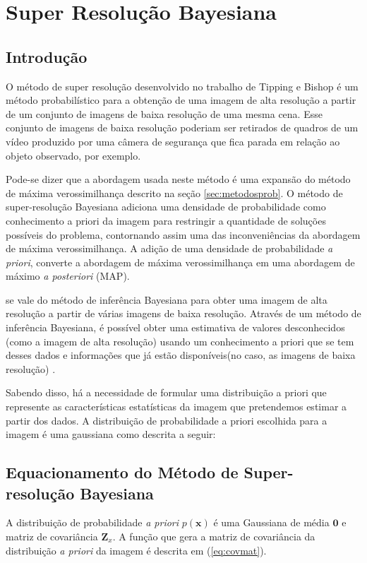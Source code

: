 \chapter{Super Resolução Bayesiana}
\label{chap:srbayes}
\section{Introdução}
O método de super resolução desenvolvido no trabalho de Tipping e Bishop \cite{tipping2003bayesian} é um método probabilístico para a obtenção de uma imagem de alta resolução
a partir de um conjunto de imagens de baixa resolução de uma mesma cena.
Esse conjunto de imagens de baixa resolução poderiam ser retirados de quadros de um
vídeo produzido por uma câmera de segurança que fica parada em relação ao objeto
observado, por exemplo.

Pode-se dizer que a abordagem usada neste método é uma expansão do método de máxima
verossimilhança descrito na seção \ref{sec:metodosprob}.
O método de super-resolução Bayesiana adiciona uma densidade de probabilidade como
conhecimento a priori da imagem para restringir a quantidade de soluções possíveis do
problema, contornando assim uma das inconveniências da abordagem de máxima verossimilhança.
A adição de uma densidade de probabilidade \emph{a priori}, converte a abordagem de máxima verossimilhança em uma abordagem de máximo \emph{a posteriori} (MAP).

se vale do método de inferência Bayesiana para obter uma imagem de alta resolução a partir de várias imagens de baixa resolução.
Através de um método de inferência Bayesiana, é possível obter uma estimativa de valores desconhecidos (como a imagem de alta resolução) usando um conhecimento a priori que se tem desses dados e informações que já estão disponíveis(no caso, as imagens de baixa resolução) \cite{therrien2011probability}.

Sabendo disso, há a necessidade de formular uma distribuição a priori que represente as características estatísticas da imagem que pretendemos estimar a partir dos dados.
A distribuição de probabilidade a priori escolhida para a imagem é uma gaussiana como descrita a seguir:

\section{Equacionamento do Método de Super-resolução Bayesiana}
A distribuição de probabilidade \emph{a priori} $p(\mathbf{x})$ é uma Gaussiana de média $\mathbf{0}$ e matriz de covariância $\mathbf{Z}_x$. A função que gera a matriz de covariância da distribuição \emph{a priori} da imagem é descrita em (\ref{eq:covmat}).

